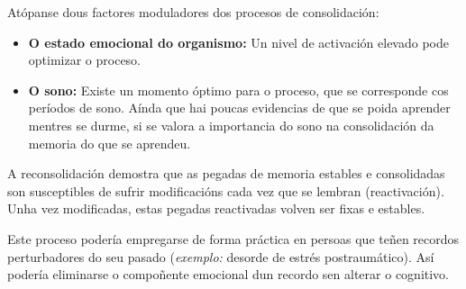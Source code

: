 \documentclass[a4paper,11pt]{article}
\begin{document}
Atópanse dous factores moduladores dos procesos de consolidación:
\begin{itemize}
	\item \textbf{O estado emocional do organismo:} Un nivel de activación elevado pode optimizar o
	proceso.
	\item \textbf{O sono:} Existe un momento óptimo para o proceso, que se corresponde cos períodos
	de sono. Aínda que hai poucas evidencias de que se poida aprender mentres se durme, si se valora
	a importancia do sono na consolidación da memoria do que se aprendeu.
\end{itemize}

A reconsolidación demostra que as pegadas de memoria estables e consolidadas son susceptibles de sufrir modificacións cada vez que se lembran (reactivación). Unha vez modificadas, estas pegadas reactivadas volven ser fixas e estables. 

Este proceso podería empregarse de forma práctica en persoas que teñen recordos perturbadores do seu pasado (\textit{exemplo:} desorde de estrés postraumático). Así podería eliminarse o compoñente emocional dun recordo sen alterar o cognitivo.
\end{document}
